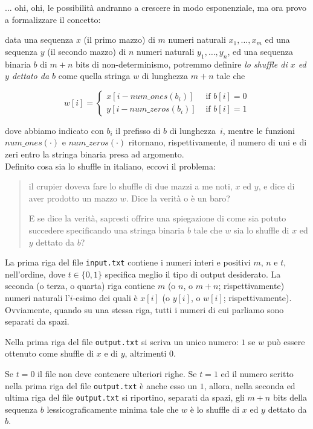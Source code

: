 ... ohi, ohi, le possibilità andranno a crescere in modo esponenziale,
ma ora provo a formalizzare il concetto:

data una sequenza $x$ (il primo mazzo)
di $m$ numeri naturali $x_1, \ldots, x_m$
ed una sequenza $y$ (il secondo mazzo)
di $n$ numeri naturali $y_1, \ldots, y_n$,
ed una sequenza binaria $b$ di $m+n$ bits di non-determinismo,
potremmo definire \emph{lo shuffle di $x$ ed $y$ dettato da $b$}
come quella stringa $w$ di lunghezza $m+n$ tale che

\[
w[i] = \left\{
         \begin{array}{ll}
          x[i- num\_ones(b_i)] & \mbox{ if $b[i]=0$} \\
          y[i- num\_zeros(b_i)] & \mbox{ if $b[i]=1$}
         \end{array}
       \right.
\]

dove abbiamo indicato con $b_i$ il prefisso di $b$ di lunghezza~$i$,
mentre le funzioni $num\_ones(\cdot)$ e $num\_zeros(\cdot)$
ritornano, rispettivamente, il numero di uni e di zeri entro la stringa binaria presa ad argomento.\\

\noindent
Definito cosa sia lo shuffle in italiano, eccovi il problema:

\begin{quote}
  il crupier doveva fare lo shuffle di due mazzi a me noti, $x$ ed $y$, e dice di aver prodotto un mazzo $w$. Dice la verità o è un baro?
  
  E se dice la verità, sapresti offrire una spiegazione di come sia potuto succedere specificando
  una stringa binaria $b$ tale che $w$ sia lo shuffle di $x$ ed $y$ dettato da $b$?
\end{quote}

La prima riga del file \verb'input.txt' contiene i numeri interi e positivi $m$, $n$ e $t$, nell'ordine, dove $t\in \{0,1\}$ specifica meglio il tipo di output desiderato.
La seconda (o terza, o quarta) riga contiene $m$ (o $n$, o $m+n$; rispettivamente) numeri naturali l'$i$-esimo dei quali è $x[i]$ (o $y[i]$, o $w[i]$; rispettivamente).
Ovviamente, quando su una stessa riga, tutti i numeri di cui parliamo sono separati da spazi.

Nella prima riga del file \verb'output.txt' si scriva un unico numero:
$1$ se $w$ può essere ottenuto come shuffle di $x$ e di $y$, altrimenti $0$.

Se $t=0$ il file non deve contenere ulteriori righe.
Se $t=1$ ed il numero scritto nella prima riga del file \verb'output.txt'
è anche esso un $1$, allora, nella seconda ed ultima riga del file \verb'output.txt' si riportino, separati da spazi, gli $m+n$ bits della sequenza $b$
lessicograficamente minima tale che
$w$ è lo shuffle di $x$ ed $y$ dettato da $b$.\\


